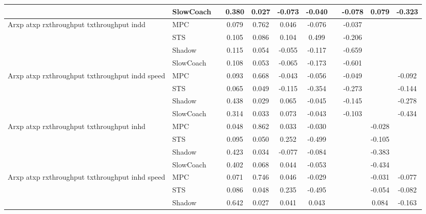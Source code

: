 \begin{tabular}{|l|l|*{9}{c|}}
                              & SlowCoach &       &     0.380 &     0.027 & -0.073 & -0.040 &     &  -0.078 &   0.079 &   -0.323 \\
\midrule
Arxp atxp rxthroughput txthroughput indd    & MPC &       &     0.079 &     0.762 &  0.046 & -0.076 &     &  -0.037 &      &       \\
                              & STS &       &     0.105 &     0.086 &  0.104 &  0.499 &     &  -0.206 &      &       \\
                              & Shadow &       &     0.115 &     0.054 & -0.055 & -0.117 &     &  -0.659 &      &       \\
                              & SlowCoach &       &     0.108 &     0.053 & -0.065 & -0.173 &     &  -0.601 &      &       \\
\midrule
Arxp atxp rxthroughput txthroughput indd speed    & MPC &       &     0.093 &     0.668 & -0.043 & -0.056 &     &  -0.049 &      &   -0.092 \\
                              & STS &       &     0.065 &     0.049 & -0.115 & -0.354 &     &  -0.273 &      &   -0.144 \\
                              & Shadow &       &     0.438 &     0.029 &  0.065 & -0.045 &     &  -0.145 &      &   -0.278 \\
                              & SlowCoach &       &     0.314 &     0.033 &  0.073 & -0.043 &     &  -0.103 &      &   -0.434 \\
\midrule
Arxp atxp rxthroughput txthroughput inhd    & MPC &       &     0.048 &     0.862 &  0.033 & -0.030 &     &      &  -0.028 &       \\
                              & STS &       &     0.095 &     0.050 &  0.252 & -0.499 &     &      &  -0.105 &       \\
                              & Shadow &       &     0.423 &     0.034 & -0.077 & -0.084 &     &      &  -0.383 &       \\
                              & SlowCoach &       &     0.402 &     0.068 &  0.044 & -0.053 &     &      &  -0.434 &       \\
\midrule
Arxp atxp rxthroughput txthroughput inhd speed    & MPC &       &     0.071 &     0.746 &  0.046 & -0.029 &     &      &  -0.031 &   -0.077 \\
                              & STS &       &     0.086 &     0.048 &  0.235 & -0.495 &     &      &  -0.054 &   -0.082 \\
                              & Shadow &       &     0.642 &     0.027 &  0.041 &  0.043 &     &      &   0.084 &   -0.163 \\

\end{tabular}
